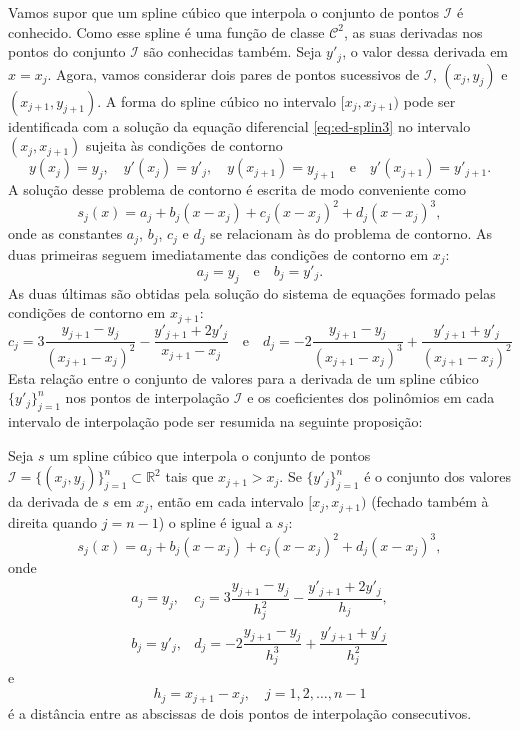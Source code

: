 Vamos supor que um spline cúbico que interpola o conjunto de pontos $\mathcal{I}$ é conhecido. Como esse spline é uma função de classe $\mathcal{C}^2$, as suas derivadas nos pontos do conjunto $\mathcal{I}$  são conhecidas também. Seja $y'_j$, o valor dessa derivada em $x=x_j$. Agora, vamos considerar dois pares de pontos sucessivos de $\mathcal{I}$,  $(x_j,y_j)$ e $(x_{j+1},y_{j+1})$. A forma do spline cúbico no intervalo $[x_j,x_{j+1})$ pode ser identificada com a solução da equação diferencial \eqref{eq:ed-splin3} no intervalo $(x_j,x_{j+1})$ sujeita às condições de contorno
\begin{equation*}
y(x_j)=y_j,\quad y'(x_j)=y'_j,\quad y(x_{j+1})=y_{j+1}\quad\text{e}\quad y'(x_{j+1})=y'_{j+1}.
\end{equation*}
A solução desse problema de contorno é escrita de modo conveniente como
\begin{equation*}
s_j(x)=a_j+b_j(x-x_j)+c_j(x-x_j)^2+d_j(x-x_j)^3,
\end{equation*}
onde as constantes $a_j$, $b_j$, $c_j$ e $d_j$ se relacionam às do problema de contorno.  As duas primeiras seguem imediatamente das condições de contorno em $x_j$:
\begin{equation*}
a_j=y_j\quad\text{e}\quad b_j=y'_j.
\end{equation*}
As duas últimas são obtidas pela solução do sistema de equações formado pelas condições de contorno em $x_{j+1}$:
\begin{equation*}
c_j=3\frac{y_{j+1}-y_j}{\left(x_{j+1}-x_j\right)^2}-\frac{y'_{j+1}+2y'_j}{x_{j+1}-x_j} \quad\text{e}\quad d_j=-2\frac{y_{j+1}-y_j}{\left(x_{j+1}-x_j\right)^3}+\frac{y'_{j+1}+y'_j}{\left(x_{j+1}-x_j\right)^2}
\end{equation*}
Esta relação entre o conjunto de valores para a derivada de um spline cúbico $\{y'_j\}_{j=1}^{n}$ nos pontos de interpolação $\mathcal{I}$ e os coeficientes dos polinômios em cada intervalo de interpolação pode ser resumida na seguinte proposição:
\begin{prop}
	Seja $s$ um spline cúbico que interpola o conjunto de pontos $\mathcal{I}=\{(x_j,y_j)\}_{j=1}^n\subset\mathbb{R}^2$ tais que $x_{j+1}>x_j$. Se $\{y'_j\}_{j=1}^n$ é o conjunto dos valores da derivada de $s$ em $x_j$, então em cada intervalo $[x_j,x_{j+1})$ (fechado também à direita quando $j=n-1$) o spline é igual a $s_j$:
	\begin{equation}\label{eq:spline3}
	s_j(x)=a_j+b_j(x-x_j)+c_j(x-x_j)^2+d_j(x-x_j)^3,
	\end{equation}
	onde
	\begin{equation}
	\begin{array}{ll}\label{eq:spline3-coef}
		a_j=y_j,&c_j=3\dfrac{y_{j+1}-y_j}{h_j^2}-\dfrac{y'_{j+1}+2y'_j}{h_j},\\
		b_j=y'_j,&d_j=-2\dfrac{y_{j+1}-y_j}{h_j^3}+\dfrac{y'_{j+1}+y'_j}{h_j^2}
	\end{array}
	\end{equation}
	e
	\begin{equation}\label{eq:espacamento}
		h_j=x_{j+1}-x_j,\quad j=1,2,\ldots,n-1
	\end{equation}
	é a distância entre as abscissas de dois pontos de interpolação consecutivos.
\end{prop}
